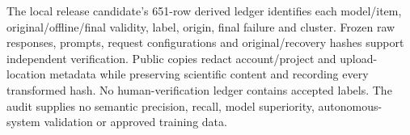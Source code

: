The local release candidate's 651-row derived ledger identifies each model/item, original/offline/final validity, label, origin, final failure and cluster. Frozen raw responses, prompts, request configurations and original/recovery hashes support independent verification. Public copies redact account/project and upload-location metadata while preserving scientific content and recording every transformed hash. No human-verification ledger contains accepted labels. The audit supplies no semantic precision, recall, model superiority, autonomous-system validation or approved training data.
